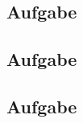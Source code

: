 \documentclass[14pt]{Article}
\begin{document}
\subsection*{Aufgabe }
\subsection*{Aufgabe }
\subsection*{Aufgabe }
\end{document}
